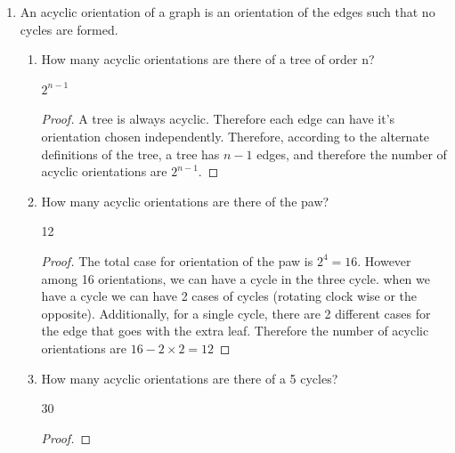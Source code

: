 \documentclass[11pt]{article}
\begin{document}
\begin{enumerate}[leftmargin=*]
\item An acyclic orientation of a graph is an orientation of the edges such that no cycles are formed. 
\begin{enumerate}[label=\alph*.]
    \item How many acyclic orientations are there of a tree of order n?
    \begin{solution}
        $2^{n-1}$
    \end{solution}
    \begin{proof}
        A tree is always acyclic. Therefore each edge can have it's orientation chosen independently. Therefore, according to the alternate definitions of the tree, a tree has $n-1$ edges, and therefore the number of acyclic orientations are $2^{n-1}$.
    \end{proof}
    \item How many acyclic orientations are there of the paw?
    \begin{solution}
        12
    \end{solution}
    \begin{proof}
        The total case for orientation of the paw is $2^4=16$. However among 16 orientations, we can have a cycle in the three cycle. when we have a cycle we can have 2 cases of cycles (rotating clock wise or the opposite). Additionally, for a single cycle, there are 2 different cases for the edge that goes with the extra leaf. Therefore the number of acyclic orientations are $16-2\times2=12$
    \end{proof}
    \item How many acyclic orientations are there of a 5 cycles?
    \begin{solution}
        30
    \end{solution}
    \begin{proof}
            

\end{proof}
\end{enumerate}
\end{enumerate}
\end{document}
